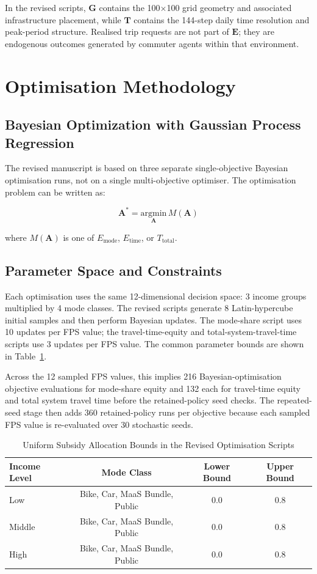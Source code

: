 In the revised scripts, $\mathbf{G}$ contains the 100$\times$100 grid geometry and associated infrastructure placement, while $\mathbf{T}$ contains the 144-step daily time resolution and peak-period structure. Realised trip requests are not part of $\mathbf{E}$; they are endogenous outcomes generated by commuter agents within that environment.

\section{Optimisation Methodology}
\label{app:optimization}

\subsection{Bayesian Optimization with Gaussian Process Regression}
The revised manuscript is based on three separate single-objective Bayesian optimisation runs, not on a single multi-objective optimiser. The optimisation problem can be written as:

\begin{equation}
\mathbf{A}^* = \underset{\mathbf{A}}{\text{argmin}} \, M(\mathbf{A})
\end{equation}

where $M(\mathbf{A})$ is one of $E_{\text{mode}}$, $E_{\text{time}}$, or $T_{\text{total}}$.

\subsection{Parameter Space and Constraints}
Each optimisation uses the same 12-dimensional decision space: 3 income groups multiplied by 4 mode classes. The revised scripts generate 8 Latin-hypercube initial samples and then perform Bayesian updates. The mode-share script uses 10 updates per FPS value; the travel-time-equity and total-system-travel-time scripts use 3 updates per FPS value. The common parameter bounds are shown in Table~\ref{tab:appendix_bounds}.

Across the 12 sampled FPS values, this implies 216 Bayesian-optimisation objective evaluations for mode-share equity and 132 each for travel-time equity and total system travel time before the retained-policy seed checks. The repeated-seed stage then adds 360 retained-policy runs per objective because each sampled FPS value is re-evaluated over 30 stochastic seeds.

\begin{table}[!h]
\centering
\caption{Uniform Subsidy Allocation Bounds in the Revised Optimisation Scripts}
\label{tab:appendix_bounds}
\begin{tabular}{lccc}
\toprule
\textbf{Income Level} & \textbf{Mode Class} & \textbf{Lower Bound} & \textbf{Upper Bound} \\
\midrule
Low & Bike, Car, MaaS Bundle, Public & 0.0 & 0.8 \\
Middle & Bike, Car, MaaS Bundle, Public & 0.0 & 0.8 \\
High & Bike, Car, MaaS Bundle, Public & 0.0 & 0.8 \\
\bottomrule
\end{tabular}
\end{table}

